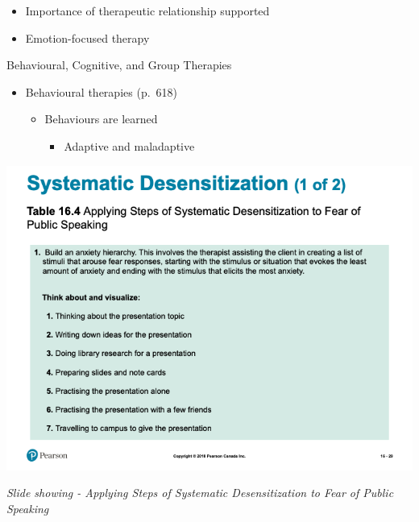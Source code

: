 \documentclass[
]{book}
\providecommand{\tightlist}{%
  \setlength{\itemsep}{0pt}\setlength{\parskip}{0pt}}
\begin{document}
\begin{reflect}
\begin{itemize}
  \begin{itemize}
  \tightlist
  \item
    Importance of therapeutic relationship supported\\
  \item
    Emotion-focused therapy
  \end{itemize}
\end{itemize}

Behavioural, Cognitive, and Group Therapies

\begin{itemize}
\tightlist
\item
  Behavioural therapies (p.~618)

  \begin{itemize}
  \tightlist
  \item
    Behaviours are learned

    \begin{itemize}
    \tightlist
    \item
      Adaptive and maladaptive
    \end{itemize}
  \end{itemize}
\end{itemize}

\includegraphics{assets/unit_11/slide_29.png}

\emph{Slide showing - Applying Steps of Systematic Desensitization to Fear of Public Speaking}


\end{reflect}
\end{document}
